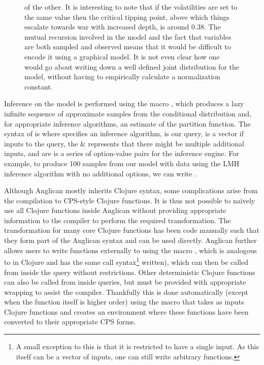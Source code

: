 \begin{figure}[p]
{of the other.  It is interesting to note that if the volatilities are set to the same value then
the critical tipping point, above which things escalate towards war with increased depth, is around $0.38$.
The mutual recursion involved in the model and the fact that variables are both sampled and 
observed means that it would be difficult to encode it using a graphical model.  It is not even clear how
one would go about writing down a well defined joint distribution for the model, without having to empirically
calculate a normalization constant.
\label{fig:probprog:schell}
		}
\end{figure}

Inference on the model is performed using the macro \doquery, which produces a lazy infinite sequence of 
approximate samples from the conditional distribution and, for appropriate inference algorithms,
an estimate of the partition function.
The syntax of \doquery is {\small {}} where {\small {}}
specifies an inference algorithm, {\small {}} is our query, {\small {}}
is a vector if inputs to the query, the \& represents that there might be multiple additional inputs, and {\small {}}
are is a series of option-value pairs for the inference engine.  For example, to produce 100 samples from
our {\small {}} model with data {\small \lsi{[2.1 5.2 1.1]}} using the LMH inference algorithm with no
additional options, we can write {\small {}}.

Although Anglican mostly inherits Clojure syntax, some complications arise from the compilation to
CPS-style Clojure functions.  It is thus not possible to na\"{i}vely use all Clojure functions inside Anglican
without providing appropriate information to the compiler to perform the required transformation.
The transformation for many core Clojure functions has been code manually such that they form
part of the Anglican syntax and can be used directly.  Anglican further allows users to write functions externally
to  using the macro , which is analogous to  in Clojure and has the same call syntax\footnote{A small
	exception to this is that it is restricted to have a single input.  As this itself can be a vector of inputs, one
	can still write arbitrary functions.}
written), which can then be called from inside the query without restrictions.  Other deterministic Clojure functions can also
be called from inside queries, but must be provided with appropriate wrapping to assist the compiler.  Thankfully
this is done automatically (except when the function itself is higher order) using the macro
{\small {}} that takes as inputs Clojure functions and creates an environment where
these functions have been converted to their appropriate CPS forms.

